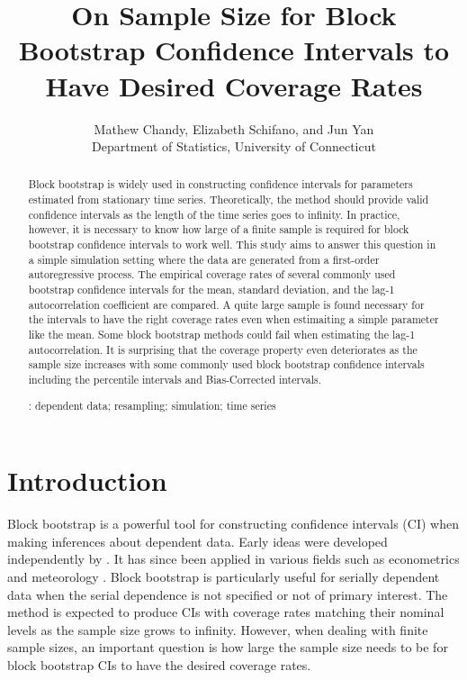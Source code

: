 \documentclass[12pt, letterpaper, titlepage]{article}
\title{On Sample Size for Block Bootstrap Confidence Intervals 
  to Have Desired Coverage Rates}
\author{Mathew Chandy, Elizabeth Schifano,
  and Jun Yan\\[1ex]
  Department of Statistics, University of Connecticut\\
}
\date{}
\begin{document}
 
\maketitle

\begin{abstract}
Block bootstrap is widely used in constructing confidence intervals for
parameters estimated from stationary time series. Theoretically, the method
should provide valid confidence intervals as the length of the time series goes
to infinity. In practice, however, it is necessary to know how large of a finite
sample is required for block bootstrap confidence intervals to work well. This
study aims to answer this question in a simple simulation setting where the data
are generated from a first-order autoregressive process. The empirical coverage
rates of several commonly used bootstrap confidence intervals for the mean,
standard deviation, and the lag-1 autocorrelation coefficient are compared.
A quite large sample is found necessary for the intervals to have the right
coverage rates even when estimaiting a simple parameter like the mean. Some
block bootstrap methods could fail when estimating the lag-1 autocorrelation.
It is surprising that the coverage property even deteriorates as the sample size
increases with some commonly used block bootstrap confidence intervals including
the percentile intervals and Bias-Corrected intervals.

\bigskip
{}:
dependent data; resampling; simulation; time series
\end{abstract}

\doublespace

\section{Introduction}
\label{sec:intro}

Block bootstrap is a powerful tool for constructing confidence intervals (CI)
when making inferences about dependent data. Early ideas were developed
independently by \citet{hall1985resampling, carlstein1986use, kunsch1989jackknife}.
It has since been applied in various fields such as econometrics
\citep{mackinnon2006bootstrap} and meteorology \citep{varga2017generalised}.
Block bootstrap is particularly useful for serially dependent
data when the serial dependence is not specified or not of primary interest.
The method is expected to produce CIs with coverage rates
matching their nominal levels as the sample size grows to infinity. However,
when dealing with finite sample sizes, an important question is how large the
sample size needs to be for block bootstrap CIs to have the
desired coverage rates.
\end{document}
